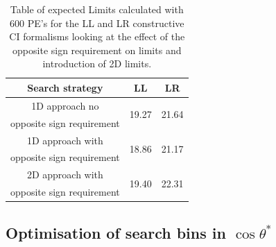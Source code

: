     \begin {table}[h]
        \begin{center}
        \begin{tabular}{ | c | c | c | } 
            \hline
            \hline
            Search strategy & LL & LR \\
            \hline
            1D approach no & \multirow{2}{*}{19.27} & \multirow{2}{*}{21.64} \\
            opposite sign requirement & & \\
            1D approach with & \multirow{2}{*}{18.86} & \multirow{2}{*}{21.17} \\
            opposite sign requirement & & \\
            2D approach with & \multirow{2}{*}{19.40} & \multirow{2}{*}{22.31} \\
            opposite sign requirement & & \\
            \hline
            \hline
        \end{tabular}
        \caption{Table of expected Limits calculated with 600 PE's for the LL and LR constructive CI formalisms looking at the effect of the opposite sign requirement on limits and introduction of 2D limits.}
        \label{tab:limits_oppSign}
        \end{center}
    \end {table}



\subsection{Optimisation of search bins in $\cos{\theta^{*}}$}
    \label{sec:binOpp}

